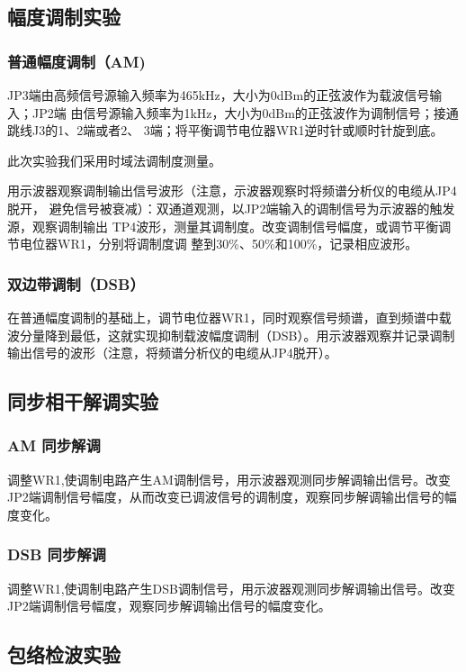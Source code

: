 \documentclass{../source/Experiment}
\begin{document}
\subsection{幅度调制实验}
\subsubsection{普通幅度调制（AM)}
JP3端由高频信号源输入频率为465kHz，大小为0dBm的正弦波作为载波信号输入；JP2端
由信号源输入频率为1kHz，大小为0dBm的正弦波作为调制信号；接通跳线J3的1、2端或者2、
3端；将平衡调节电位器WR1逆时针或顺时针旋到底。

此次实验我们采用时域法调制度测量。

用示波器观察调制输出信号波形（注意，示波器观察时将频谱分析仪的电缆从JP4脱开，
避免信号被衰减）：双通道观测，以JP2端输入的调制信号为示波器的触发源，观察调制输出
TP4波形，测量其调制度。改变调制信号幅度，或调节平衡调节电位器WR1，分别将调制度调
整到30\%、50\%和100\%，记录相应波形。

\subsubsection{双边带调制（DSB）}

在普通幅度调制的基础上，调节电位器WR1，同时观察信号频谱，直到频谱中载波分量降到最低，这就实现抑制载波幅度调制（DSB）。用示波器观察并记录调制输出信号的波形（注意，将频谱分析仪的电缆从JP4脱开）。

\subsection{同步相干解调实验}

\subsubsection{AM 同步解调}

调整WR1,使调制电路产生AM调制信号，用示波器观测同步解调输出信号。改变JP2端调制信号幅度，从而改变已调波信号的调制度，观察同步解调输出信号的幅度变化。

\subsubsection{DSB 同步解调}

调整WR1,使调制电路产生DSB调制信号，用示波器观测同步解调输出信号。改变JP2端调制信号幅度，观察同步解调输出信号的幅度变化。

\subsection{包络检波实验}
\end{document}
